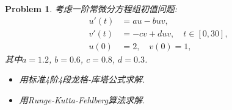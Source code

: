 \documentclass[a4paper, 12pt]{ctexart}
\theoremstyle{plain}
\newtheorem{problem}{Problem}[section]
\theoremstyle{plain}
\theoremstyle{plain}
\theoremstyle{nonumberplain}
\begin{document}
    \begin{problem}
        \label{problem: 2}
        考虑一阶常微分方程组初值问题:
        \begin{equation}
            \label{equation: problem2}
            \begin{aligned}
                u'(t) &= au - buv,\\
                v'(t) &= -cv + duv,\quad t\in [0, 30],\\
                u(0) &= 2,\quad v(0) = 1,
            \end{aligned}
        \end{equation}
        其中$a=1.2$, $b=0.6$, $c=0.8$, $d=0.3$.
        \begin{itemize}
            \item 用标准4阶4段龙格-库塔公式求解.
            \item 用Runge-Kutta-Fehlberg算法求解.
        \end{itemize}
    \end{problem}
\end{document}
